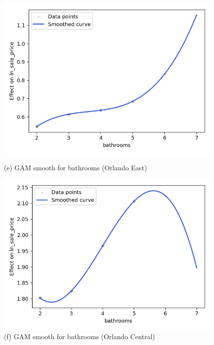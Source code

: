 \begin{figure}[H]
  \centering
  \begin{minipage}[t]{0.48\textwidth}
    \centering
    \includegraphics[width=\linewidth]{Figures/orlando_east_bathrooms_smooth.png}
    \caption*{\small(e) GAM smooth for bathrooms (Orlando East)}
  \end{minipage}
  \hfill
  \begin{minipage}[t]{0.48\textwidth}
    \centering
    \includegraphics[width=\linewidth]{Figures/orlando_central_bathrooms_smooth.png}
    \caption*{\small(f) GAM smooth for bathrooms (Orlando Central)}
  \end{minipage}
\end{figure}

